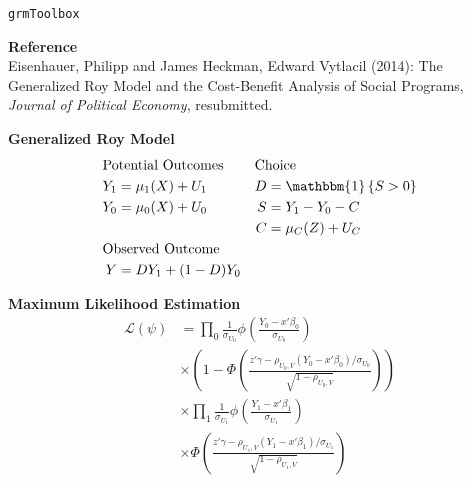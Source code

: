 \begin{frame}[fragile]
\begin{center}\huge
\verb+grmToolbox+
\end{center}
\end{frame}


\begin{frame}\begin{center}
	
	\textbf{Reference}\\\vspace{0.3cm}
    Eisenhauer, Philipp and James Heckman, Edward Vytlacil (2014): The Generalized Roy Model and the Cost-Benefit Analysis of Social Programs, \textit{Journal of Political Economy}, resubmitted.
    \end{center}
\end{frame}

\begin{frame}
\textbf{Generalized Roy Model}
\begin{align*}
\mc{2}{l}{\text{Potential Outcomes}}  &\mc{2}{l}{\text{Choice}}\\
Y_1 & = \mu_1{(X)} + U_1 		& D & = \mathbbm{1}\left\{ S > 0 \right\}\\
Y_0 & = \mu_0{(X)} + U_0 		& S & = Y_1 - Y_0 - C\\
		&& C & = \mu_C(Z) + U_C\\
\mc{2}{l}{\text{Observed Outcome}}  	&   & \\
Y   & = D Y_1 + (1 - D)Y_0	  		    	&   &  \\
\end{align*}
\end{frame}

\begin{frame}
\textbf{Maximum Likelihood Estimation}\vspace{0.5cm}
\begin{align*}
\mathcal{L(\psi)}&= \prod_{0} \frac{1}{\sigma_{U_0}} \phi \left( \frac{Y_0  - x'\beta_0}{\sigma_{U_0}}\right)\\
		     & \times\left( 1 - \Phi\left(\frac{z'\gamma - \rho_{U_0,V}(Y_0 - x'\beta_0)/\sigma_{U_0} }{\sqrt{1 - \rho_{U_0,V}}}\right)\right)\\
	& \times\prod_{1} \frac{1}{\sigma_{U_1}} \phi \left( \frac{Y_1  - x'\beta_1}{\sigma_{U_1}}\right)\\
		     & \times\Phi\left(\frac{z'\gamma - \rho_{U_1,V}(Y_1 - x'\beta_1)/\sigma_{U_1} }{\sqrt{1 - \rho_{U_1,V}}}\right)\\
\end{align*}
\end{frame}

